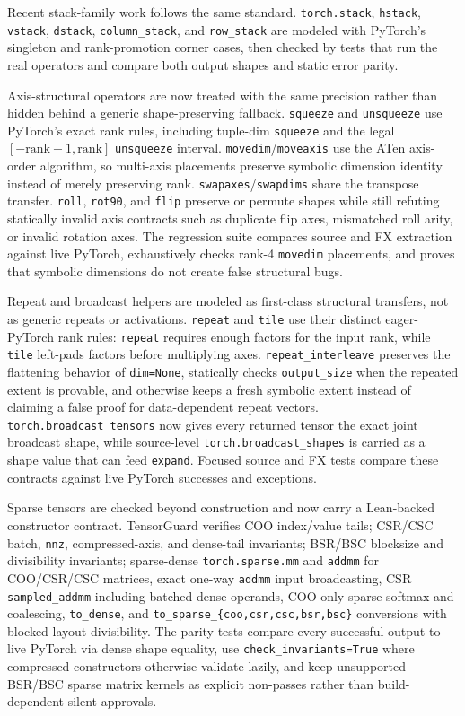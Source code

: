 \documentclass[11pt]{article}
\newcommand{\tg}{TensorGuard}
\begin{document}
Recent stack-family work follows the same standard.  \texttt{torch.stack},
\texttt{hstack}, \texttt{vstack}, \texttt{dstack},
\texttt{column\_stack}, and \texttt{row\_stack} are modeled with PyTorch's
singleton and rank-promotion corner cases, then checked by tests that run the
real operators and compare both output shapes and static error parity.

Axis-structural operators are now treated with the same precision rather than
hidden behind a generic shape-preserving fallback.  \texttt{squeeze} and
\texttt{unsqueeze} use PyTorch's exact rank rules, including tuple-dim
\texttt{squeeze} and the legal \([-\mathrm{rank}-1,\mathrm{rank}]\)
\texttt{unsqueeze} interval.  \texttt{movedim}/\texttt{moveaxis} use the ATen
axis-order algorithm, so multi-axis placements preserve symbolic dimension
identity instead of merely preserving rank.  \texttt{swapaxes}/\texttt{swapdims}
share the transpose transfer.  \texttt{roll}, \texttt{rot90}, and \texttt{flip}
preserve or permute shapes while still refuting statically invalid axis
contracts such as duplicate flip axes, mismatched roll arity, or invalid rotation
axes.  The regression suite compares source and FX extraction against live
PyTorch, exhaustively checks rank-4 \texttt{movedim} placements, and proves that
symbolic dimensions do not create false structural bugs.

Repeat and broadcast helpers are modeled as first-class structural transfers,
not as generic repeats or activations.  \texttt{repeat} and \texttt{tile} use
their distinct eager-PyTorch rank rules: \texttt{repeat} requires enough factors
for the input rank, while \texttt{tile} left-pads factors before multiplying
axes.  \texttt{repeat\_interleave} preserves the flattening behavior of
\texttt{dim=None}, statically checks \texttt{output\_size} when the repeated
extent is provable, and otherwise keeps a fresh symbolic extent instead of
claiming a false proof for data-dependent repeat vectors.
\texttt{torch.broadcast\_tensors} now gives every returned tensor the exact joint
broadcast shape, while source-level \texttt{torch.broadcast\_shapes} is carried
as a shape value that can feed \texttt{expand}.  Focused source and FX tests
compare these contracts against live PyTorch successes and exceptions.

Sparse tensors are checked beyond construction and now carry a Lean-backed
constructor contract.  \tg{} verifies COO index/value tails; CSR/CSC batch,
\texttt{nnz}, compressed-axis, and dense-tail invariants; BSR/BSC blocksize and
divisibility invariants; sparse-dense
\texttt{torch.sparse.mm} and \texttt{addmm} for COO/CSR/CSC matrices, exact
one-way \texttt{addmm} input broadcasting, CSR \texttt{sampled\_addmm} including
batched dense operands, COO-only sparse softmax and coalescing,
\texttt{to\_dense}, and \texttt{to\_sparse\_\{coo,csr,csc,bsr,bsc\}}
conversions with blocked-layout divisibility.  The parity tests compare every
successful output to live PyTorch via dense shape equality, use
\texttt{check\_invariants=True} where compressed constructors otherwise validate
lazily, and keep unsupported BSR/BSC sparse matrix kernels as explicit
non-passes rather than build-dependent silent approvals.
\end{document}

